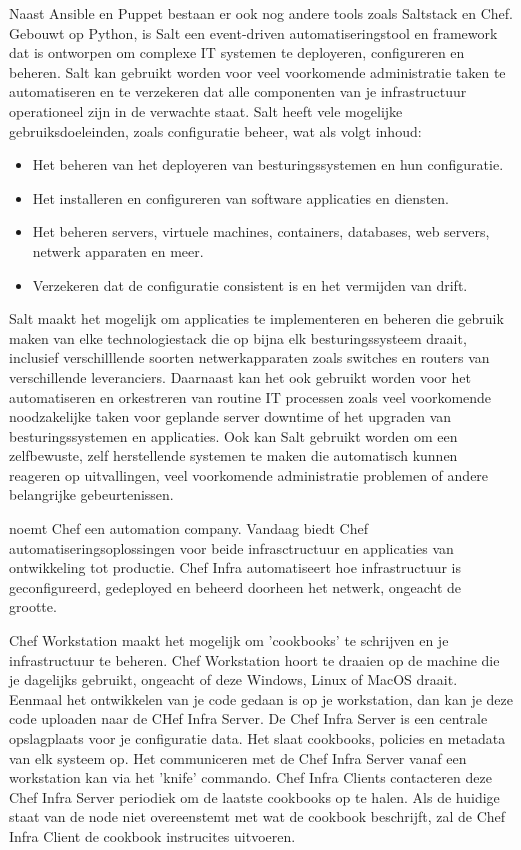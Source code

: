 Naast Ansible en Puppet bestaan er ook nog andere tools zoals Saltstack en Chef.
Gebouwt op Python, is Salt een event-driven automatiseringstool en framework dat is ontworpen om complexe IT systemen te deployeren, configureren en beheren. Salt kan gebruikt worden voor veel voorkomende administratie taken te automatiseren en te verzekeren dat alle componenten van je infrastructuur operationeel zijn in de verwachte staat.
Salt heeft vele mogelijke gebruiksdoeleinden, zoals configuratie beheer, wat als volgt inhoud:
\begin{itemize}
  \item Het beheren van het deployeren van besturingssystemen en hun configuratie.
  \item Het installeren en configureren van software applicaties en diensten.
  \item Het beheren servers, virtuele machines, containers, databases, web servers, netwerk apparaten en meer.
  \item Verzekeren dat de configuratie consistent is en het vermijden van drift.
\end{itemize}

Salt maakt het mogelijk om applicaties te implementeren en beheren die gebruik maken van elke technologiestack die op bijna elk besturingssysteem draait, inclusief verschilllende soorten netwerkapparaten zoals switches en routers van verschillende leveranciers.
Daarnaast kan het ook gebruikt worden voor het automatiseren en orkestreren van routine IT processen zoals veel voorkomende noodzakelijke taken voor geplande server downtime of het upgraden van besturingssystemen en applicaties. 
Ook kan Salt gebruikt worden om een zelfbewuste, zelf herstellende systemen te maken die automatisch kunnen reageren op uitvallingen, veel voorkomende administratie problemen of andere belangrijke gebeurtenissen. \autocite{Saltstack} \break

\textcite{Chef} noemt Chef een automation company. Vandaag biedt Chef automatiseringsoplossingen voor beide infrasctructuur en applicaties van ontwikkeling tot productie.
Chef Infra automatiseert hoe infrastructuur is geconfigureerd, gedeployed en beheerd doorheen het netwerk, ongeacht de grootte.

Chef Workstation maakt het mogelijk om 'cookbooks' te schrijven en je infrastructuur te beheren. Chef Workstation hoort te draaien op de machine die je dagelijks gebruikt, ongeacht of deze Windows, Linux of MacOS draait.
Eenmaal het ontwikkelen van je code gedaan is op je workstation, dan kan je deze code uploaden naar de CHef Infra Server. De Chef Infra Server is een centrale opslagplaats voor je configuratie data. Het slaat cookbooks, policies en metadata van elk systeem op. Het communiceren met de Chef Infra Server vanaf een workstation kan via het 'knife' commando.
Chef Infra Clients contacteren deze Chef Infra Server periodiek om de laatste cookbooks op te halen. Als de huidige staat van de node niet overeenstemt met wat de cookbook beschrijft, zal de Chef Infra Client de cookbook instrucites uitvoeren. \autocite{Chef} \break

